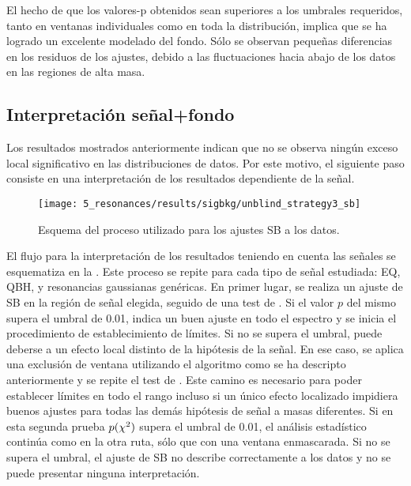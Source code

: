 El hecho de que los valores-p obtenidos sean superiores a los umbrales requeridos, tanto en ventanas individuales como en toda la distribución, implica que se ha logrado un excelente modelado del fondo. Sólo se observan pequeñas diferencias en los residuos de los ajustes, debido a las fluctuaciones hacia abajo de los datos en las regiones de alta masa.









\subsection{Interpretación señal+fondo}
\label{subsec:results:results:bkgsig}

Los resultados mostrados anteriormente indican que no se observa ningún exceso local significativo en las distribuciones de datos. Por este motivo, el siguiente paso consiste en una interpretación de los resultados dependiente de la señal.

\begin{figure}[ht!]
    \centering
    \texttt{[image: 5\_resonances/results/sigbkg/unblind\_strategy3\_sb]}
    \caption{Esquema del proceso utilizado para los ajustes \ac{SB} a los datos.}
    \label{fig:results:results:bkgsig:strat}
\end{figure}

El flujo para la interpretación de los resultados teniendo en cuenta las señales se esquematiza en la \Fig{\ref{fig:results:results:bkgsig:strat}}. Este proceso se repite para cada tipo de señal estudiada: \acf{EQ}, \acf{QBH}, y resonancias gaussianas genéricas.
En primer lugar, se realiza un ajuste de \ac{SB} en la región de señal elegida, seguido de una test de \chisq. Si el valor \(p\) del mismo supera el umbral de 0.01, indica un buen ajuste en todo el espectro y se inicia el procedimiento de establecimiento de límites. Si no se supera el umbral, puede deberse a un efecto local distinto de la hipótesis de la señal. En ese caso, se aplica una exclusión de ventana utilizando el algoritmo \bh como se ha descripto anteriormente y se repite el test de \chisq. Este camino es necesario para poder establecer límites en todo el rango \myj incluso si un único efecto localizado impidiera buenos ajustes para todas las demás hipótesis de señal a masas diferentes. Si en esta segunda prueba \(p(\chi^{2})\) supera el umbral de 0.01, el análisis estadístico continúa como en la otra ruta, sólo que con una ventana enmascarada. Si no se supera el umbral, el ajuste de \ac{SB} no describe correctamente a los datos y no se puede presentar ninguna interpretación.

